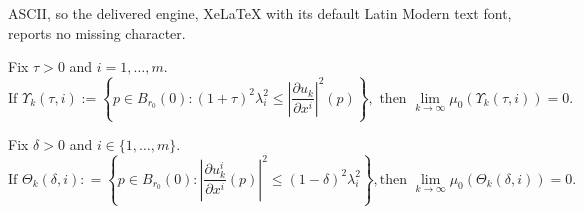 \documentclass[10pt,a4paper]{amsart}
\begin{document}
ASCII, so the delivered engine, XeLaTeX with its default Latin Modern text font, reports no missing character.
\begin{lemma} \label{upsilonprime}
Fix $\tau >0$ and $i=1, \dots, m$.  
\[
\mbox{If }
\Upsilon_k(\tau, i):=\left\{ p \in  B_{r_0}(0):   (1+ \tau)^2 \lambda_i^2  \leq  \left|\frac{\partial u_k}{\partial x^i} \right|^2(p)\right\},
\mbox{ 
then }
\lim_{k \to \infty}\mu_0(\Upsilon_k(\tau, i))=0.
\]
\end{lemma}

\begin{lemma} \label{omega*}
Fix  $\delta>0$ and $i\in \{1, \dots, m\}$. 
\[
\mbox{If }
\Theta_k(\delta, i): =\left\{ p \in B_{r_0}(0):   \left|\frac{\partial u_k^i}{\partial x^i}(p) \right|^2 \leq  (1-\delta)^2\lambda_i^2 \right\}, 
\mbox{
then } 
\lim_{k\to\infty}\mu_0(\Theta_k(\delta, i))=0. 
\]
\end{lemma}
\end{document}
